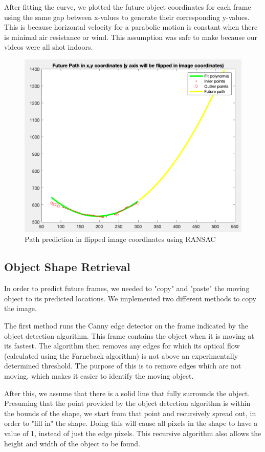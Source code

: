 \documentclass[12pt]{article}
\begin{document}
After fitting the curve, we plotted the future object coordinates for each frame using the same gap between x-values to generate their corresponding y-values. This is because horizontal velocity for a parabolic motion is constant when there is minimal air resistance or wind. This assumption was safe to make because our videos were all shot indoors.
\begin{figure}[h]
  \centering
    \includegraphics[scale=0.4]{figures/ransac1.png}
    \caption{Path prediction in flipped image coordinates using RANSAC}
    \label{RANSAC results}
\end{figure}


\subsection*{Object Shape Retrieval}

In order to predict future frames, we needed to "copy" and "paste" the moving object to its predicted locations. We implemented two different methods to copy the image.

The first method runs the Canny edge detector on the frame indicated by the object detection algorithm. This frame contains the object when it is moving at its fastest. The algorithm then removes any edges for which its optical flow (calculated using the Farneback algorithm) is not above an experimentally determined threshold. The purpose of this is to remove edges which are not moving, which makes it easier to identify the moving object.

After this, we assume that there is a solid line that fully surrounds the object. Presuming that the point provided by the object detection algorithm is within the bounds of the shape, we start from that point and recursively spread out, in order to "fill in" the shape. Doing this will cause all pixels in the shape to have a value of 1, instead of just the edge pixels. This recursive algorithm also allows the height and width of the object to be found.
\end{document}
